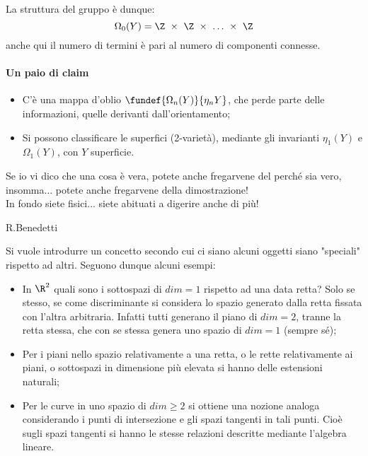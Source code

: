 La struttura del gruppo è dunque: 
\begin{equation*}
\Omega_0(Y) = \Z~\times~\Z~\times~\dots~\times~\Z
\end{equation*}
anche qui il numero di termini è pari al numero di componenti connesse.


\paragraph{Un paio di claim}
\begin{itemize}
\item C'è una mappa d'oblio $\fundef{\Omega_n(Y)}{\eta_n{Y}}$, che perde parte delle informazioni, quelle derivanti dall'orientamento;
\item Si possono classificare le superfici (2-varietà), mediante gli invarianti $\eta_1(Y)$ e $\Omega_1(Y)$, con $Y$ superficie.
\end{itemize}


\epigraph{Se io vi dico che una cosa è vera, potete anche fregarvene del perché sia vero, insomma... potete anche fregarvene della dimostrazione!\\ In fondo siete fisici... siete abituati a digerire anche di più!}{R.Benedetti}

Si vuole introdurre un concetto secondo cui ci siano alcuni oggetti siano "speciali" rispetto ad altri. Seguono dunque alcuni esempi:

\begin{es}
\begin{itemize}
\item In $\R^2$ quali sono i sottospazi di $dim = 1$ rispetto ad una data retta? Solo se stesso, se come discriminante si considera lo spazio generato dalla retta fissata con l'altra arbitraria. Infatti tutti generano il piano di $dim = 2$, tranne la retta stessa, che con se stessa genera uno spazio di $dim = 1$ (sempre sé);
\item Per i piani nello spazio relativamente a una retta, o le rette relativamente ai piani, o sottospazi in dimensione più elevata si hanno delle estensioni naturali;
\item Per le curve in uno spazio di $dim \geq 2$ si ottiene una nozione analoga considerando i punti di intersezione e gli spazi tangenti in tali punti. Cioè sugli spazi tangenti si hanno le stesse relazioni descritte mediante l'algebra lineare.
\end{itemize}
\end{es}


